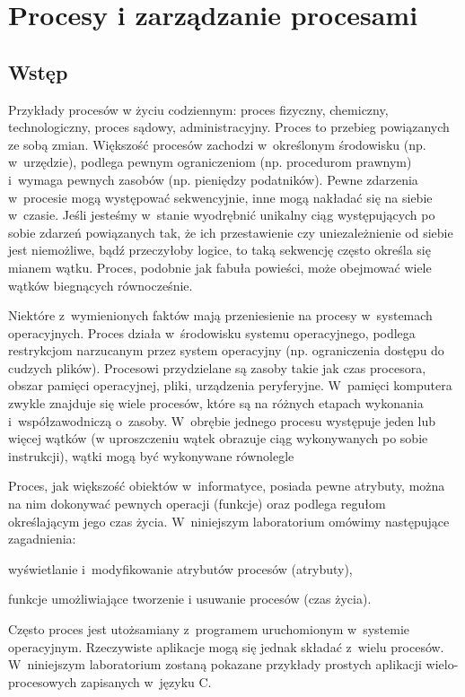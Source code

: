 \section{Procesy i zarządzanie procesami}

\subsection{Wstęp}

Przykłady procesów w życiu codziennym: proces fizyczny, chemiczny,
technologiczny, proces sądowy, administracyjny. Proces to przebieg powiązanych
ze sobą zmian. Większość procesów zachodzi w~określonym środowisku (np.
w~urzędzie), podlega pewnym ograniczeniom (np.  procedurom prawnym) i~wymaga
pewnych zasobów (np.  pieniędzy podatników). Pewne zdarzenia w~procesie
mogą występować sekwencyjnie, inne mogą nakładać się na siebie w~czasie. Jeśli
jesteśmy w~stanie wyodrębnić unikalny ciąg występujących po sobie zdarzeń
powiązanych tak, że ich przestawienie czy uniezależnienie od siebie jest
niemożliwe, bądź przeczyłoby logice, to taką sekwencję często określa się
mianem wątku. Proces, podobnie jak fabuła powieści, może obejmować wiele wątków
biegnących równocześnie.

Niektóre z~wymienionych faktów mają przeniesienie na procesy w~systemach
operacyjnych. Proces działa w~środowisku systemu operacyjnego, podlega
restrykcjom narzucanym przez system operacyjny (np. ograniczenia dostępu do
cudzych plików). Procesowi przydzielane są zasoby takie jak czas procesora,
obszar pamięci operacyjnej, pliki, urządzenia peryferyjne. W~pamięci komputera
zwykle znajduje się wiele procesów, które są na różnych etapach wykonania
i~współzawodniczą o~zasoby. W~obrębie jednego procesu występuje jeden lub
więcej wątków (w uproszczeniu wątek obrazuje ciąg wykonywanych po sobie
instrukcji), wątki mogą być wykonywane równolegle

Proces, jak większość obiektów w~informatyce, posiada pewne atrybuty, można na
nim dokonywać pewnych operacji (funkcje) oraz podlega regułom określającym jego
czas życia. W~niniejszym laboratorium omówimy następujące zagadnienia:
\begin{myitemize}
  \item wyświetlanie i~modyfikowanie atrybutów procesów (atrybuty),
  \item funkcje umożliwiające tworzenie i usuwanie procesów (czas życia).
\end{myitemize}

Często proces jest utożsamiany z~programem uruchomionym w~systemie operacyjnym.
Rzeczywiste aplikacje mogą się jednak składać z~wielu procesów. W~niniejszym
laboratorium zostaną pokazane przykłady prostych aplikacji wielo-procesowych
zapisanych w~języku C.


